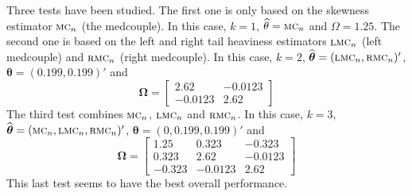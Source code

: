 Three tests have been studied. The first one is only based on the skewness
estimator $\stsc{MC}_n$ (the medcouple). In this case, $k=1$, $\sthat{\theta} =
\stsc{MC}_n$ and $\Omega = 1.25$. The second one is based on the left and right
tail heaviness estimators $\stsc{LMC}_n$ (left medcouple) and $\stsc{RMC}_n$
(right medcouple). In this case, $k=2$, $\sthat{\boldsymbol\theta} =
(\stsc{LMC}_n, \stsc{RMC}_n)'$, $\boldsymbol\theta = (0.199, 0.199)'$ and
\[
    \boldsymbol\Omega = 
    \begin{bmatrix}
        2.62    & -0.0123\\
        -0.0123 & 2.62
    \end{bmatrix}
\]
The third test combines $\stsc{MC}_n$, $\stsc{LMC}_n$ and $\stsc{RMC}_n$. In
this case, $k=3$, $\sthat{\boldsymbol\theta} = (\stsc{MC}_n, \stsc{LMC}_n,
\stsc{RMC}_n)'$, $\boldsymbol\theta = (0, 0.199, 0.199)'$ and
\[
    \boldsymbol\Omega =
    \begin{bmatrix}
        1.25   & 0.323   & -0.323  \\
        0.323  & 2.62    & -0.0123 \\
        -0.323 & -0.0123 & 2.62
    \end{bmatrix}
\]
This last test seems to have the best overall performance.

